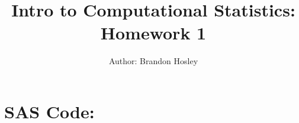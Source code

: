 \documentclass[a4paper,man,natbib]{apa6}
\title{Intro to Computational Statistics: Homework 1}
\author{Author: Brandon Hosley}
\affiliation{Instructor: Liang Kong, Ph.D}
\begin{document}
	\maketitle
	
	\section{SAS Code:}
	\singlespacing
	\inputminted[bgcolor=light-gray]{sas}{./DAT502-HW1.sas}
	\clearpage
	
\end{document}
